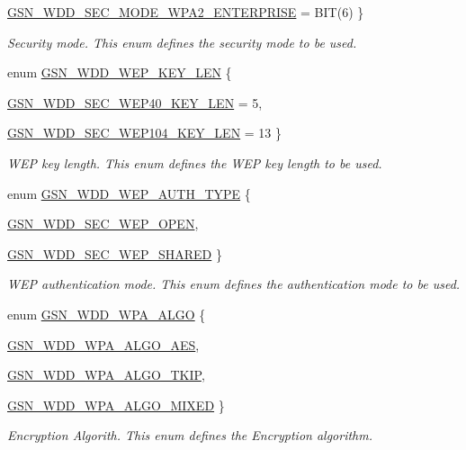 \begin{DoxyCompactItemize}
\par
\hyperlink{a00604_a1bc8fa529d709c2a8a87aee6038fb7eca5724b55751f957d7794f8e075efd4fef}{GSN\_\-WDD\_\-SEC\_\-MODE\_\-WPA2\_\-ENTERPRISE} =  BIT(6)
 \}
\begin{DoxyCompactList}\small\item\em Security mode. This enum defines the security mode to be used. \end{DoxyCompactList}\item 
enum \hyperlink{a00604_a2f5e27be6ba83f628dd6ee8f2becf7ba}{GSN\_\-WDD\_\-WEP\_\-KEY\_\-LEN} \{ \par
\hyperlink{a00604_a2f5e27be6ba83f628dd6ee8f2becf7baa17b74eb88779b1c1830b4aa2a68f55f8}{GSN\_\-WDD\_\-SEC\_\-WEP40\_\-KEY\_\-LEN} =  5, 
\par
\hyperlink{a00604_a2f5e27be6ba83f628dd6ee8f2becf7baa5f85d918ca6a35cf52f0776ebb929e71}{GSN\_\-WDD\_\-SEC\_\-WEP104\_\-KEY\_\-LEN} =  13
 \}
\begin{DoxyCompactList}\small\item\em WEP key length. This enum defines the WEP key length to be used. \end{DoxyCompactList}\item 
enum \hyperlink{a00604_a4e509d9d0746f0bdbd70053f516ce369}{GSN\_\-WDD\_\-WEP\_\-AUTH\_\-TYPE} \{ \par
\hyperlink{a00604_a4e509d9d0746f0bdbd70053f516ce369a05e7c4c5f53b8618867d07a7931292c0}{GSN\_\-WDD\_\-SEC\_\-WEP\_\-OPEN}, 
\par
\hyperlink{a00604_a4e509d9d0746f0bdbd70053f516ce369a393e4efd39580b13e3bbbc4cc94ca131}{GSN\_\-WDD\_\-SEC\_\-WEP\_\-SHARED}
 \}
\begin{DoxyCompactList}\small\item\em WEP authentication mode. This enum defines the authentication mode to be used. \end{DoxyCompactList}\item 
enum \hyperlink{a00604_aecc980a483691db1cb8b70fed3fdb438}{GSN\_\-WDD\_\-WPA\_\-ALGO} \{ \par
\hyperlink{a00604_aecc980a483691db1cb8b70fed3fdb438a0be5e8a9efe38814726fb10810bdf1b9}{GSN\_\-WDD\_\-WPA\_\-ALGO\_\-AES}, 
\par
\hyperlink{a00604_aecc980a483691db1cb8b70fed3fdb438a542301d6dc2756a85f5e7c0e3a15275a}{GSN\_\-WDD\_\-WPA\_\-ALGO\_\-TKIP}, 
\par
\hyperlink{a00604_aecc980a483691db1cb8b70fed3fdb438ab9cb0f7e5557d31af8e2ea242bff74d6}{GSN\_\-WDD\_\-WPA\_\-ALGO\_\-MIXED}
 \}
\begin{DoxyCompactList}\small\item\em Encryption Algorith. This enum defines the Encryption algorithm. \end{DoxyCompactList}\item 

\end{DoxyCompactItemize}
